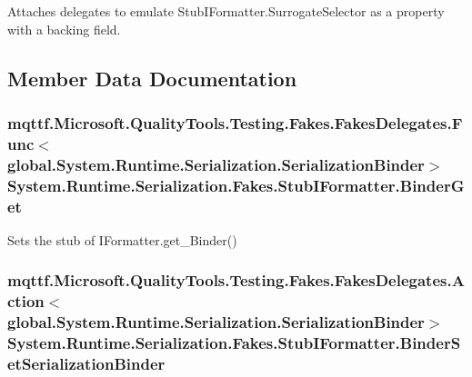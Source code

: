 Attaches delegates to emulate Stub\-I\-Formatter.\-Surrogate\-Selector as a property with a backing field.



\subsection{Member Data Documentation}
\hypertarget{class_system_1_1_runtime_1_1_serialization_1_1_fakes_1_1_stub_i_formatter_af96ae7eeccf7bf1d8df9048ecda1c1e7}{
\subsubsection[{Binder\-Get}]{\setlength{\rightskip}{0pt plus 5cm}mqttf.\-Microsoft.\-Quality\-Tools.\-Testing.\-Fakes.\-Fakes\-Delegates.\-Func$<$global.\-System.\-Runtime.\-Serialization.\-Serialization\-Binder$>$ System.\-Runtime.\-Serialization.\-Fakes.\-Stub\-I\-Formatter.\-Binder\-Get}}\label{class_system_1_1_runtime_1_1_serialization_1_1_fakes_1_1_stub_i_formatter_af96ae7eeccf7bf1d8df9048ecda1c1e7}


Sets the stub of I\-Formatter.\-get\-\_\-\-Binder()

\hypertarget{class_system_1_1_runtime_1_1_serialization_1_1_fakes_1_1_stub_i_formatter_a742d7d117eb9203070abc3c4a8580e7c}{
\subsubsection[{Binder\-Set\-Serialization\-Binder}]{\setlength{\rightskip}{0pt plus 5cm}mqttf.\-Microsoft.\-Quality\-Tools.\-Testing.\-Fakes.\-Fakes\-Delegates.\-Action$<$global.\-System.\-Runtime.\-Serialization.\-Serialization\-Binder$>$ System.\-Runtime.\-Serialization.\-Fakes.\-Stub\-I\-Formatter.\-Binder\-Set\-Serialization\-Binder}}\label{class_system_1_1_runtime_1_1_serialization_1_1_fakes_1_1_stub_i_formatter_a742d7d117eb9203070abc3c4a8580e7c}


